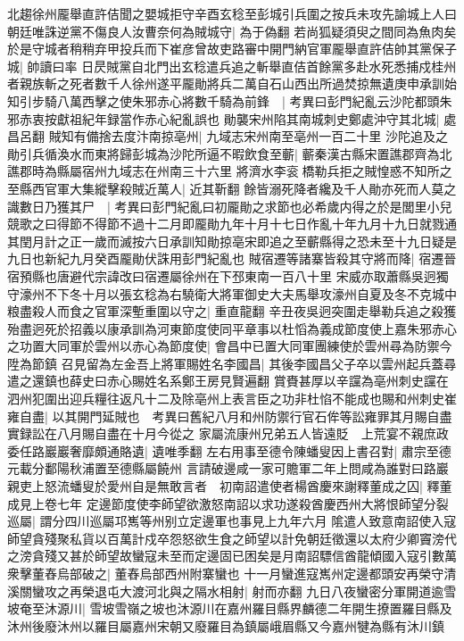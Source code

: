 北趨徐州龎舉直許佶聞之嬰城拒守辛酉玄稔至彭城引兵圍之按兵未攻先諭城上人曰朝廷唯誅逆黨不傷良人汝曹奈何為賊城守|{
	為于偽翻}
若尚狐疑須臾之間同為魚肉矣於是守城者稍稍弃甲投兵而下崔彦曾故吏路審中開門納官軍龎舉直許佶帥其黨保子城|{
	帥讀曰率}
日昃賊黨自北門出玄稔遣兵追之斬舉直佶首餘黨多赴水死悉捕戍桂州者親族斬之死者數千人徐州遂平龎勛將兵二萬自石山西出所過焚掠無遺庚申承訓始知引步騎八萬西擊之使朱邪赤心將數千騎為前鋒　|{
	考異曰彭門紀亂云沙陀都頭朱邪赤衷按獻祖紀年録當作赤心紀亂誤也}
勛襲宋州陷其南城刺史鄭處沖守其北城|{
	處昌呂翻}
賊知有備捨去度汴南掠亳州|{
	九域志宋州南至亳州一百二十里}
沙陀追及之勛引兵循渙水而東將歸彭城為沙陀所逼不暇飲食至蘄|{
	蘄秦漢古縣宋置譙郡齊為北譙郡時為縣屬宿州九域志在州南三十六里}
將濟水李衮橋勒兵拒之賊惶惑不知所之至縣西官軍大集縱擊殺賊近萬人|{
	近其靳翻}
餘皆溺死降者纔及千人勛亦死而人莫之識數日乃獲其尸　|{
	考異曰彭門紀亂曰初龎勛之求節也必希歲内得之於是閭里小兒競歌之曰得節不得節不過十二月即龎勛九年十月十七日作亂十年九月十九日就戮通其閏月計之正一歲而滅按六日承訓知勛掠亳宋即追之至蘄縣得之恐未至十九日疑是九日也新紀九月癸酉龎勛伏誅用彭門紀亂也}
賊宿遷等諸寨皆殺其守將而降|{
	宿遷晉宿預縣也唐避代宗諱改曰宿遷屬徐州在下邳東南一百八十里}
宋威亦取蕭縣吳迥獨守濠州不下冬十月以張玄稔為右驍衛大將軍御史大夫馬舉攻濠州自夏及冬不克城中粮盡殺人而食之官軍深塹重圍以守之|{
	重直龍翻}
辛丑夜吳迥突圍走舉勒兵追之殺獲殆盡迥死於招義以康承訓為河東節度使同平章事以杜慆為義成節度使上嘉朱邪赤心之功置大同軍於雲州以赤心為節度使|{
	會昌中已置大同軍團練使於雲州尋為防禦今陞為節鎮}
召見留為左金吾上將軍賜姓名李國昌|{
	其後李國昌父子卒以雲州起兵蓋尋遣之還鎮也薛史曰赤心賜姓名系鄭王房見賢遍翻}
賞賚甚厚以辛讜為亳州刺史讜在泗州犯圍出迎兵糧往返凡十二及除亳州上表言臣之功非杜惂不能成也賜和州刺史崔雍自盡|{
	以其開門延賊也　考異曰舊紀八月和州防禦行官石侔等訟雍罪其月賜自盡實録訟在八月賜自盡在十月今從之}
家屬流康州兄弟五人皆遠貶　上荒宴不親庶政委任路巖巖奢靡頗通賂遺|{
	遺唯季翻}
左右用事至德令陳蟠叟因上書召對|{
	肅宗至德元載分鄱陽秋浦置至德縣屬饒州}
言請破邊咸一家可贍軍二年上問咸為誰對曰路巖親吏上怒流蟠叟於愛州自是無敢言者　初南詔遣使者楊酋慶來謝釋董成之囚|{
	釋董成見上卷七年}
定邊節度使李師望欲激怒南詔以求功遂殺酋慶西州大將恨師望分裂巡屬|{
	謂分四川巡屬邛嶲等州别立定邊軍也事見上九年六月}
隂遣人致意南詔使入寇師望貪殘聚私貨以百萬計戍卒怨怒欲生食之師望以計免朝廷徵還以太府少卿竇滂代之滂貪殘又甚於師望故蠻寇未至而定邊固已困矣是月南詔驃信酋龍傾國入寇引數萬衆擊董舂烏部破之|{
	董舂烏部西州附寨蠻也}
十一月蠻進寇嶲州定邊都頭安再榮守清溪關蠻攻之再榮退屯大渡河北與之隔水相射|{
	射而亦翻}
九日八夜蠻密分軍開道逾雪坡奄至沐源川|{
	雪坡雪嶺之坡也沐源川在嘉州羅目縣界麟德二年開生撩置羅目縣及沐州後廢沐州以羅目屬嘉州宋朝又廢羅目為鎮屬峨眉縣又今嘉州犍為縣有沐川鎮}
